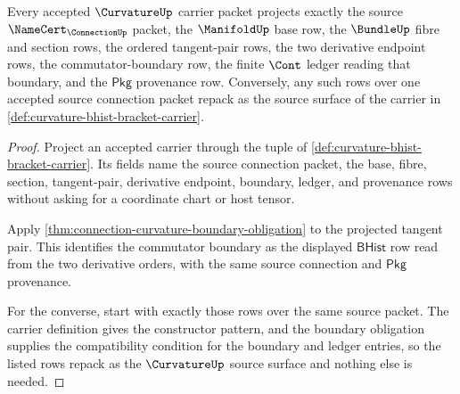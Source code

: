 \begin{theorem}
\label{thm:curvature-source-row-coverage}
Every accepted $\CurvatureUp$ carrier packet projects exactly the source $\NameCert_{\ConnectionUp}$ packet, the $\ManifoldUp$ base row, the $\BundleUp$ fibre and section rows, the ordered tangent-pair rows, the two derivative endpoint rows, the commutator-boundary row, the finite $\Cont$ ledger reading that boundary, and the $\mathsf{Pkg}$ provenance row. Conversely, any such rows over one accepted source connection packet repack as the source surface of the carrier in \autoref{def:curvature-bhist-bracket-carrier}.
\end{theorem}
\begin{proof}
Project an accepted carrier through the tuple of \autoref{def:curvature-bhist-bracket-carrier}. Its fields name the source connection packet, the base, fibre, section, tangent-pair, derivative endpoint, boundary, ledger, and provenance rows without asking for a coordinate chart or host tensor.

Apply \autoref{thm:connection-curvature-boundary-obligation} to the projected tangent pair. This identifies the commutator boundary as the displayed $\mathsf{BHist}$ row read from the two derivative orders, with the same source connection and $\mathsf{Pkg}$ provenance.

For the converse, start with exactly those rows over the same source packet. The carrier definition gives the constructor pattern, and the boundary obligation supplies the compatibility condition for the boundary and ledger entries, so the listed rows repack as the $\CurvatureUp$ source surface and nothing else is needed.
\end{proof}


